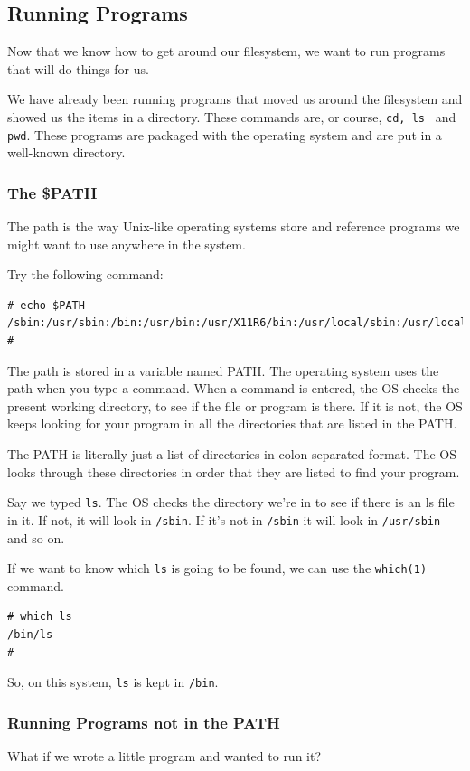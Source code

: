 \subsection{Running Programs}
Now that we know how to get around our filesystem, we want to run programs that
will do things for us.

We have already been running programs that moved us around the filesystem and showed us the items in a directory.  
These commands are, or course, {\tt cd, ls } and {\tt pwd}. These programs are packaged with the 
operating system and are put in a well-known directory.

\subsubsection{The \$PATH}
The path is the way Unix-like operating systems store and reference programs we might want
to use anywhere in the system.

Try the following command:
{\tt \begin{verbatim}
# echo $PATH                                                                            
/sbin:/usr/sbin:/bin:/usr/bin:/usr/X11R6/bin:/usr/local/sbin:/usr/local/bin
# 
\end{verbatim}
}

The path is stored in a variable named PATH. The operating system uses the path when you type a command.
When a command is entered, the OS checks the present working directory, to see if the file or program is there.  
If it is not, the OS keeps looking for your program in all the directories that are listed in the PATH.

The PATH is literally just a list of directories in colon-separated format.  The OS looks through these directories
in order that they are listed to find your program.

Say we typed {\tt ls}.  The OS checks the directory we're in to see if there is an ls file in it. If not, it will look in {\tt /sbin}.
If it's not in {\tt /sbin} it will look in {\tt /usr/sbin} and so on.

If we want to know which {\tt ls} is going to be found, we can use the {\tt which(1)} command.
{\tt \begin{verbatim}
# which ls
/bin/ls
# 
\end{verbatim}
}
So, on this system, {\tt ls} is kept in {\tt /bin}.

\subsubsection{Running Programs not in the PATH}
What if we wrote a little program and wanted to run it?

